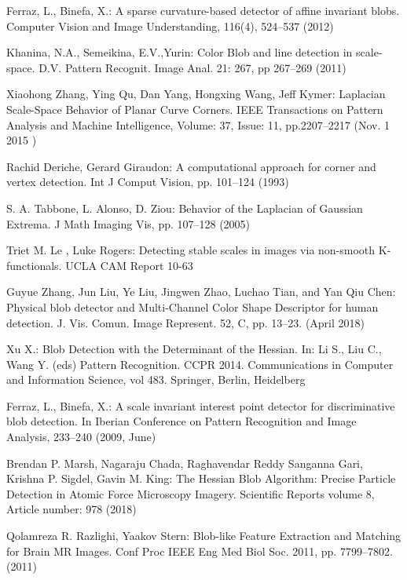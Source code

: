 \documentclass[twocolumn]{svjour3}          %
\begin{document}
\begin{thebibliography}{16}
Ferraz, L., Binefa, X.:
A sparse curvature-based detector of affine invariant blobs. 
Computer Vision and Image Understanding, 116(4), 524--537 (2012)

Khanina, N.A., Semeikina, E.V.,Yurin:
Color Blob and line detection in scale-space.
D.V. Pattern Recognit. Image Anal.  21: 267, pp 267–269 (2011)

Xiaohong Zhang, Ying Qu, Dan Yang, Hongxing Wang, Jeff Kymer:
Laplacian Scale-Space Behavior of Planar Curve Corners.
IEEE Transactions on Pattern Analysis and Machine Intelligence, Volume: 37, Issue: 11, pp.2207--2217 (Nov. 1 2015 )

Rachid Deriche, Gerard Giraudon:
A computational approach for corner and vertex detection.
Int J Comput Vision, pp. 101--124 (1993)

S. A. Tabbone, L. Alonso, D. Ziou:
Behavior of the Laplacian of Gaussian Extrema.
J Math Imaging Vis, pp. 107–128 (2005)

Triet M. Le , Luke Rogers:
Detecting stable scales in images via non-smooth K-functionals.
UCLA CAM Report 10-63

Guyue Zhang, Jun Liu, Ye Liu, Jingwen Zhao, Luchao Tian, and Yan Qiu Chen:
Physical blob detector and Multi-Channel Color Shape Descriptor for human detection. 
J. Vis. Comun. Image Represent. 52, C, pp. 13--23. (April 2018)

Xu X.:
Blob Detection with the Determinant of the Hessian.
In: Li S., Liu C., Wang Y. (eds) Pattern Recognition. CCPR 2014. Communications in Computer and Information Science, vol 483. Springer, Berlin, Heidelberg

Ferraz, L., Binefa, X.:
A scale invariant interest point detector for discriminative blob detection. 
In Iberian Conference on Pattern Recognition and Image Analysis, 233--240  (2009, June)

Brendan P. Marsh, Nagaraju Chada, Raghavendar Reddy Sanganna Gari, Krishna P. Sigdel, Gavin M. King:
The Hessian Blob Algorithm: Precise Particle Detection in Atomic Force Microscopy Imagery.
Scientific Reports volume 8, Article number: 978 (2018) 

Qolamreza R. Razlighi, Yaakov Stern:
Blob-like Feature Extraction and Matching for Brain MR Images.
Conf Proc IEEE Eng Med Biol Soc. 2011, pp. 7799--7802. (2011) 


\end{thebibliography}
\end{document}
